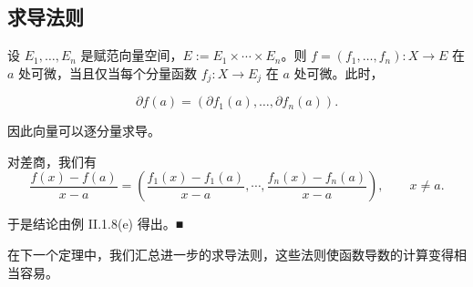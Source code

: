 \subsection*{求导法则}

\begin{proposition}

设 $ E_1, \ldots, E_n $ 是赋范向量空间，$ E := E_1 \times \cdots \times E_n $。则 $ f = (f_1, \ldots, f_n) : X \to E $ 在 $ a $ 处可微，当且仅当每个分量函数 $ f_j : X \to E_j $ 在 $ a $ 处可微。此时，

\[
\partial f(a)=\left(\partial f_{1}(a),\ldots,\partial f_{n}(a)\right).
\]

因此向量可以逐分量求导。

\proofhead
对差商，我们有
\[
\frac{f(x)-f(a)}{x-a}=\left(\frac{f_{1}(x)-f_{1}(a)}{x-a},\cdots,\frac{f_{n}(x)-f_{n}(a)}{x-a}\right),\qquad x\neq a.
\]

于是结论由例 II.1.8(e) 得出。■

\end{proposition}

在下一个定理中，我们汇总进一步的求导法则，这些法则使函数导数的计算变得相当容易。

